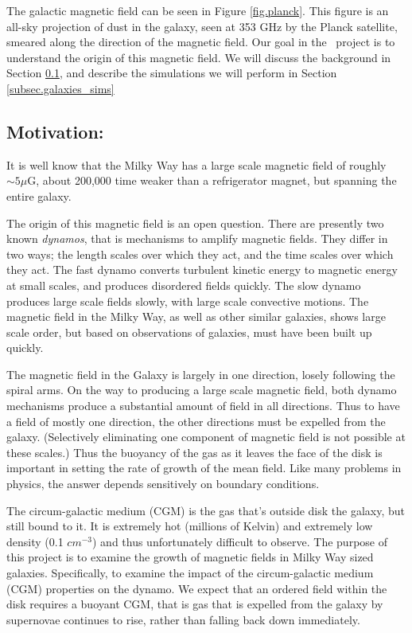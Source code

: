 The galactic magnetic field can be seen in Figure \ref{fig.planck}.  This figure
is an all-sky projection of dust in the galaxy, seen at 353 GHz by the Planck
satellite, smeared along the direction of
the magnetic field.  Our goal in the \nameGalaxies\ project is to understand the
origin of this magnetic field.  We will discuss the background in Section
\ref{subsec.galaxies_motivate}, and describe the simulations we will perform in
Section \ref{subsec.galaxies_sims}

\subsection{Motivation: \nameGalaxies}
\label{subsec.galaxies_motivate}

It is well know that the Milky Way has a large scale magnetic
field of roughly $\sim 5 \mu$G, about 200,000 time weaker than a refrigerator
magnet, but spanning the entire galaxy.   

The origin of this magnetic field is an open question.  There are presently two
known \emph{dynamos}, that is mechanisms to amplify magnetic fields. They differ in
two ways; the length scales over which they act, and the time scales over which
they act.  The fast
dynamo converts turbulent kinetic energy to magnetic energy at small scales, and
produces disordered fields quickly.  The slow dynamo produces large scale fields
slowly, with large scale convective motions. The magnetic field in the Milky Way, as well as other similar galaxies,
shows large scale order, but based on observations of galaxies, must have been
built up quickly. 

The magnetic field in the Galaxy is largely in one direction, losely following
the spiral arms.  On the way to producing a large scale magnetic field, both
dynamo mechanisms produce a
substantial amount of field in all directions.  Thus to have a field of mostly
one direction, the other directions must be expelled from the galaxy.
(Selectively eliminating one component of magnetic field is not possible at
these scales.)
Thus the buoyancy of the gas as
it leaves the face of the disk is important in setting the rate of growth of
the mean field.  Like many problems in physics, the answer depends sensitively
on boundary conditions.

The circum-galactic medium (CGM) is the gas that's outside disk the galaxy, but still
bound to it.  It is extremely hot (millions of Kelvin) and extremely low density
(0.1 $cm^{-3}$) and thus unfortunately difficult to observe.
The purpose of this project is to examine the growth of magnetic fields in Milky
Way sized galaxies.  
Specifically, to examine the impact of the circum-galactic
medium (CGM) properties on the dynamo. We expect that an ordered field within
the disk requires a buoyant CGM, that is gas that is expelled from the galaxy by
supernovae continues to rise, rather than falling back down immediately.  

